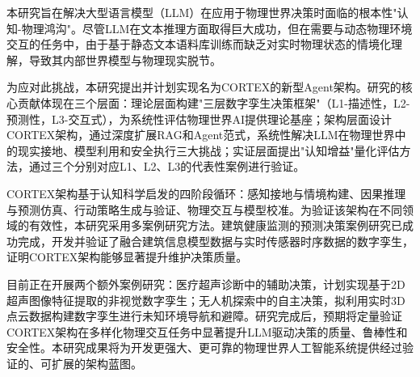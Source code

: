 
本研究旨在解决大型语言模型（LLM）在应用于物理世界决策时面临的根本性"认知-物理鸿沟"。尽管LLM在文本推理方面取得巨大成功，但在需要与动态物理环境交互的任务中，由于基于静态文本语料库训练而缺乏对实时物理状态的情境化理解，导致其内部世界模型与物理现实脱节。

为应对此挑战，本研究提出并计划实现名为CORTEX的新型Agent架构。研究的核心贡献体现在三个层面：理论层面构建"三层数字孪生决策框架"（L1-描述性，L2-预测性，L3-交互式），为系统性评估物理世界AI提供理论基座；架构层面设计CORTEX架构，通过深度扩展RAG和Agent范式，系统性解决LLM在物理世界中的现实接地、模型利用和安全执行三大挑战；实证层面提出"认知增益"量化评估方法，通过三个分别对应L1、L2、L3的代表性案例进行验证。

CORTEX架构基于认知科学启发的四阶段循环：感知接地与情境构建、因果推理与预测仿真、行动策略生成与验证、物理交互与模型校准。为验证该架构在不同领域的有效性，本研究采用多案例研究方法。建筑健康监测的预测决策案例研究已成功完成，开发并验证了融合建筑信息模型数据与实时传感器时序数据的数字孪生，证明CORTEX架构能够显著提升维护决策质量。

目前正在开展两个额外案例研究：医疗超声诊断中的辅助决策，计划实现基于2D超声图像特征提取的非视觉数字孪生；无人机探索中的自主决策，拟利用实时3D点云数据构建数字孪生进行未知环境导航和避障。研究完成后，预期将定量验证CORTEX架构在多样化物理交互任务中显著提升LLM驱动决策的质量、鲁棒性和安全性。本研究成果将为开发更强大、更可靠的物理世界人工智能系统提供经过验证的、可扩展的架构蓝图。